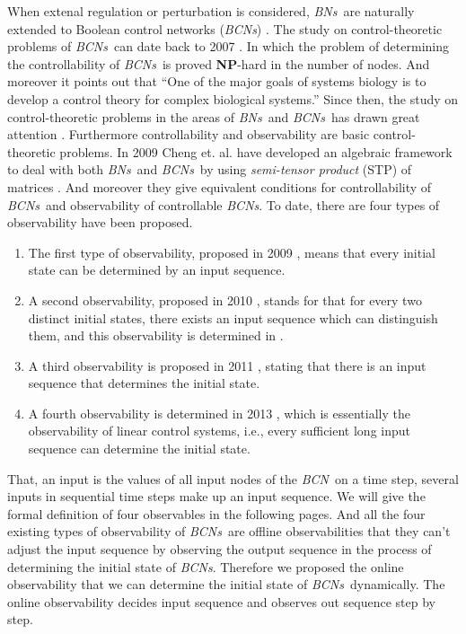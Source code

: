 \documentclass[conference]{IEEEtran} %
\def \BNs {{\em BNs}}
\def \BCN {{\em BCN}}
\def \BCNs {{\em BCNs}}
\newcommand{\rev}[1]{{\color{red}{#1}}}
\newcommand{\tl}[1]{\textcolor{blue} {TL: #1 :TL} }
\begin{document}
When extenal regulation or perturbation is considered, \BNs\ are naturally extended to Boolean control networks ({\em BCNs}) \cite{Ideker2001A}. The study on control-theoretic problems of \BCNs\ can date back to 2007 \cite{Akutsu2007Control}. In which the problem of determining the controllability of \BCNs\ is proved {\bf NP}-hard in the number of nodes. And moreover it points out that ``One of the major goals of systems biology is to develop a control theory for complex biological systems.'' Since then, the study on control-theoretic problems in the areas of \BNs\ and \BCNs\ has drawn great attention \cite{Fornasini2013Observability, Zhao2010Input, Cheng2011Identification, Cheng2011Analysis, cheng2009controllability}. Furthermore controllability and observability are basic control-theoretic problems. In 2009 Cheng et. al.   have developed an algebraic framework to deal with both \BNs\ and \BCNs\ by using \emph{semi-tensor product} (STP) of matrices \cite{cheng2009controllability}. And moreover they give equivalent conditions for controllability of \BCNs\ and observability of controllable {\em BCNs}. To date, there are four types of observability have been proposed. 

\begin{enumerate}
	\item The first type of observability, proposed in 2009 \cite{cheng2009controllability}, means that every initial state can be determined by an input sequence.
	
	\item 
	A second observability, proposed in 2010 \cite{Zhao2010Input}, stands for that for every two distinct initial states, there exists an input sequence which can distinguish them, and this observability is determined in \cite{Li2015Controllability}.
	
	\item A third observability is proposed in 2011 \cite{Cheng2011Identification}, stating that there is an input sequence that determines the initial state.
	
	\item  A fourth observability is determined in 2013 \cite{Fornasini2013Observability}, which is essentially the observability of linear control systems, i.e., every sufficient long input sequence can determine the initial state.
\end{enumerate}
 


That, an input is the values of all input nodes of the \BCN\ on a time step, several inputs in sequential time steps make up an input sequence. We will give the formal definition of four observables in the following pages. And all the four existing types of observability of \BCNs\ are offline observabilities that they can't adjust the input sequence by observing the output sequence in the process of determining the initial state of {\em BCNs}. Therefore we proposed the online observability that we can determine the initial state of \BCNs\ dynamically. The online observability decides input sequence and observes out sequence step by step.
\end{document}
